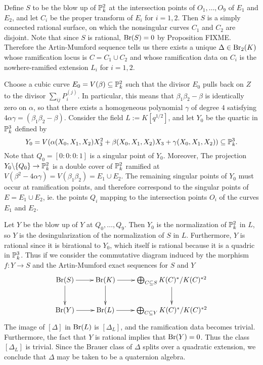 Define $S$ to be the blow up of $\mathbb{P}_k^2$ at the intersection points of $O_1,\dots,O_9$ of $E_1$ and $E_2$, and let $C_i$ be the proper transform of $E_i$ for $i=1,2$.  Then $S$ is a simply connected rational surface, on which the nonsingular curves $C_1$ and $C_2$ are disjoint.  Note that since $S$ is rational, $\textnormal{Br}(S) = 0$ by Proposition FIXME.  Therefore the Artin-Mumford sequence tells us there exists a unique $\Delta\in\textnormal{Br}_2(K)$ whose ramification locus is $C = C_1\cup C_2$ and whose ramification data on $C_i$ is the nowhere-ramified extension $L_i$ for $i=1,2$.

Choose a cubic curve $E_0 = V(\beta)\subseteq \mathbb{P}^2_k$ such that the divisor $E_0$ pulls back on $Z$ to the divisor $\sum_{ij}P_i^{(j)}$.  In particular, this means that $\beta_1\beta_2-\beta$ is identically zero on $\alpha$, so that there exists a homogeneous polynomial $\gamma$ of degree $4$ satisfying $4\alpha\gamma = (\beta_1\beta_2-\beta)$.  Consider the field $L := K[q^{1/2}]$, and let $Y_0$ be the quartic in $\mathbb{P}^3_k$ defined by
$$Y_0 = V(\alpha(X_0,X_1,X_2)X_3^2 + \beta(X_0,X_1,X_2)X_3 + \gamma(X_0,X_1,X_2))\subseteq \mathbb{P}^3_k.$$
Note that $Q_0 = [0:0:0:1]$ is a singular point of $Y_0$.  Moreover, The projection $Y_0\backslash\{Q_0\}\rightarrow\mathbb{P}^2_k$ is a double cover of $\mathbb{P}^2_k$ ramified at $V(\beta^2-4\alpha\gamma) = V(\beta_1\beta_2) = E_1\cup E_2$.  The remaining singular points of $Y_0$ must occur at ramification points, and therefore correspond to the singular points of $E = E_1\cup E_2$, ie. the points $Q_i$ mapping to the intersection points $O_i$ of the curves $E_1$ and $E_2$.

Let $Y$ be the blow up of $Y$ at $Q_0,\dots, Q_9$.  Then $Y_0$ is the normalization of $\mathbb{P}^2_k$ in $L$, so $Y$ is the desingularization of the normalization of $S$ in $L$.  Furthermore, $Y$ is rational since it is birational to $Y_0$, which itself is rational because it is a quadric in $\mathbb{P}^3_k$.  Thus if we consider the commutative diagram induced by the morphism $f: Y\rightarrow S$ and the Artin-Mumford exact sequences for $S$ and $Y$
$$\xymatrix{
\Br(S) \ar[r]\ar[d] & \Br(K) \ar[r]\ar[d] & \bigoplus_{C\subseteq S} K(C)^*/K(C)^{*2}\ar[d]\\
\Br(Y) \ar[r] & \Br(L) \ar[r] & \bigoplus_{C\subseteq Y} K(C)^*/K(C)^{*2}
}$$
The image of $[\Delta]$ in $\textnormal{Br}(L)$ is $[\Delta_L]$, and the ramification data becomes trivial.  Furthermore, the fact that $Y$ is rational implies that $\textnormal{Br}(Y) =0$.  Thus the class $[\Delta_L]$ is trivial.  Since the Brauer class of $\Delta$ splits over a quadratic extension, we conclude that $\Delta$ may be taken to be a quaternion algebra.

